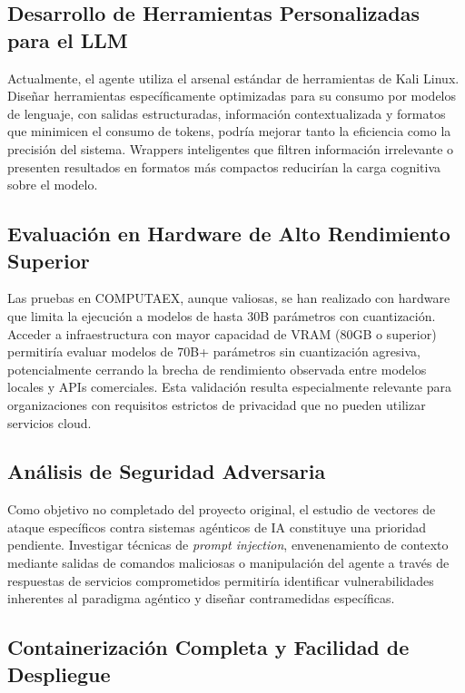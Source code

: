 \subsection{Desarrollo de Herramientas Personalizadas para el LLM}

Actualmente, el agente utiliza el arsenal estándar de herramientas de Kali Linux. Diseñar herramientas específicamente optimizadas para su consumo por modelos de lenguaje, con salidas estructuradas, información contextualizada y formatos que minimicen el consumo de tokens, podría mejorar tanto la eficiencia como la precisión del sistema. Wrappers inteligentes que filtren información irrelevante o presenten resultados en formatos más compactos reducirían la carga cognitiva sobre el modelo.

\subsection{Evaluación en Hardware de Alto Rendimiento Superior}

Las pruebas en COMPUTAEX, aunque valiosas, se han realizado con hardware que limita la ejecución a modelos de hasta 30B parámetros con cuantización. Acceder a infraestructura con mayor capacidad de VRAM (80GB o superior) permitiría evaluar modelos de 70B+ parámetros sin cuantización agresiva, potencialmente cerrando la brecha de rendimiento observada entre modelos locales y APIs comerciales. Esta validación resulta especialmente relevante para organizaciones con requisitos estrictos de privacidad que no pueden utilizar servicios cloud.

\subsection{Análisis de Seguridad Adversaria}

Como objetivo no completado del proyecto original, el estudio de vectores de ataque específicos contra sistemas agénticos de IA constituye una prioridad pendiente. Investigar técnicas de \textit{prompt injection}, envenenamiento de contexto mediante salidas de comandos maliciosas o manipulación del agente a través de respuestas de servicios comprometidos permitiría identificar vulnerabilidades inherentes al paradigma agéntico y diseñar contramedidas específicas.

\subsection{Containerización Completa y Facilidad de Despliegue}


